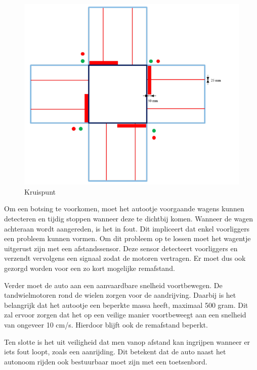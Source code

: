 \documentclass[a4paper,twoside,kulak]{kulakreport} %
\begin{document}
\begin{figure}
	\centering
	\includegraphics[width=.6\textwidth]{volglijnenEnStoplijnen}
	\caption{Kruispunt}
	\label{fig:plattegrond}
\end{figure}

Om een botsing te voorkomen, moet het autootje voorgaande wagens kunnen detecteren en tijdig stoppen wanneer deze te dichtbij komen. Wanneer de wagen achteraan wordt aangereden, is het in fout. Dit impliceert dat enkel voorliggers een probleem kunnen vormen. Om dit probleem op te lossen moet het wagentje uitgerust zijn met een afstandssensor. Deze sensor detecteert voorliggers en verzendt vervolgens een signaal zodat de motoren vertragen. Er moet dus ook gezorgd worden voor een zo kort mogelijke remafstand. %

Verder moet de auto aan een aanvaardbare snelheid voortbewegen. De tandwielmotoren rond de wielen zorgen voor de aandrijving. Daarbij is het belangrijk dat het autootje een beperkte massa heeft, maximaal 500 gram. Dit zal ervoor zorgen dat het op een veilige manier voortbeweegt aan een snelheid van ongeveer 10 cm/s. Hierdoor blijft ook de remafstand beperkt.

Ten slotte is het uit veiligheid dat men vanop afstand kan ingrijpen wanneer er iets fout loopt, zoals een aanrijding. Dit betekent dat de auto naast het autonoom rijden ook bestuurbaar moet zijn met een toetsenbord.




\end{document}
